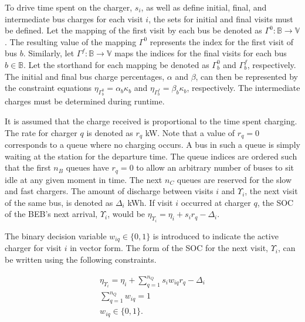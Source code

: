 \documentclass[utf8]{FrontiersinHarvard}
\begin{document}
To drive time spent on the charger, $s_i$, as well as define initial, final, and intermediate bus charges for each visit
$i$, the sets for initial and final visits must be defined. Let the mapping of the first visit by each bus be denoted as
$\Gamma^0 : \mathbb{B} \rightarrow \mathbb{V}$. The resulting value of the mapping $\Gamma^0$ represents the index for
the first visit of bus $b$. Similarly, let $\Gamma^f : \mathbb{B} \rightarrow \mathbb{V}$ maps the indices for the final
visits for each bus $b \in \mathbb{B}$. Let the storthand for each mapping be denoted as $\Gamma^0_b$ and $\Gamma^f_b$,
respectively. The initial and final bus charge percentages, $\alpha$ and $\beta$, can then be represented by the
constraint equations $\eta_{\Gamma^0_b} = \alpha_b \kappa_{b}$ and $\eta_{\Gamma^f_b} = \beta_b \kappa_{b}$,
respectively. The intermediate charges must be determined during runtime.

It is assumed that the charge received is proportional to the time spent charging. The rate for charger \(q\) is denoted
as \(r_q\) kW. Note that a value of \(r_q = 0\) corresponds to a queue where no charging occurs. A bus in such a queue is
simply waiting at the station for the departure time. The queue indices are ordered such that the first \(n_B\) queues
have \(r_q = 0\) to allow an arbitrary number of buses to sit idle at any given moment in time. The next \(n_C\) queues are
reserved for the slow and fast chargers. The amount of discharge between visits \(i\) and \(\Upsilon_i\), the next visit of the
same bus, is denoted as \(\Delta_i\) kWh. If visit \(i\) occurred at charger \(q\), the SOC of the BEB's next arrival, \(\Upsilon_i\), would
be \(\eta_{\Upsilon_i} = \eta_i + s_i r_q - \Delta_i\).

The binary decision variable \(w_{iq} \in \{0,1\}\) is introduced to indicate the active charger for visit \(i\) in vector
form. The form of the SOC for the next visit, \(\Upsilon_i\), can be written using the following constraints.

\begin{subequations}
    \label{subeq:pre_next_charge}
\begin{align}
    \eta_{\Upsilon_i} = \eta_i + \sum_{q=1}^{n_Q} s_i w_{iq} r_q - \Delta_i \\
    \sum_{q=1}^{n_Q} w_{iq} = 1                           \\
    w_{iq} \in \{0,1\}.
\end{align}
\end{subequations}
\end{document}
